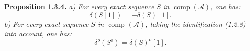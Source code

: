 \medskip\noindent\textbf{Proposition 1.3.4.}\quad
\textit{a) For every exact sequence $S$ in
$\operatorname{comp}(\mathcal A)$, one has:}
\[
\delta(S[1])=-\delta(S)[1].
\]
\noindent\textit{b) For every exact sequence $S$ in
$\operatorname{comp}(\mathcal A)$, taking the identification (1.2.8) into
account, one has:}
\[
\delta^o(S^o)=\delta(S)^o[1].
\]
\endgroup
